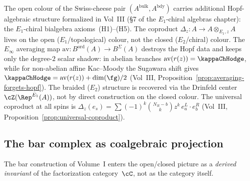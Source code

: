 \begin{remark}
\label{rem:e1-chiral-bialgebra-vol3}
The open colour of the Swiss-cheese pair $(A^{\mathrm{bulk}}, A^{\mathrm{bdy}})$ carries additional Hopf-algebraic structure formalized in Vol~III (\S7 of the $E_1$-chiral algebras chapter): the $E_1$-chiral bialgebra axioms~(H1)--(H5). The coproduct $\Delta_z \colon A \to A \otimes_{E_1,z} A$ lives on the open ($E_1$/topological) colour, not the closed ($E_2$/chiral) colour. The $E_\infty$ averaging map $\mathrm{av} \colon B^{\mathrm{ord}}(A) \to B^{\Sigma}(A)$ destroys the Hopf data and keeps only the degree-$2$ scalar shadow: in abelian branches $\mathrm{av}(r(z))=\kappaChHodge$, while for non-abelian affine Kac--Moody the Sugawara shift gives $\kappaChHodge=\mathrm{av}(r(z))+\dim(\fg)/2$ (Vol~III, Proposition~\ref{prop:averaging-forgets-hopf}). The braided ($E_2$) structure is recovered via the Drinfeld center $\cZ(\Rep^{E_1}(A))$, not by direct construction on the closed colour. The universal coproduct at all spins is $\Delta_z(e_s) = \sum (-1)^k \binom{N_R - b}{k} z^k \, e_a^L \cdot e_b^R$ (Vol~III, Proposition~\ref{prop:universal-coproduct}).
\end{remark}

\subsection{The bar complex as coalgebraic projection}

The bar construction of Volume~I enters the open/closed picture as
a \emph{derived invariant} of the factorization category~$\cC$, not
as the category itself.

